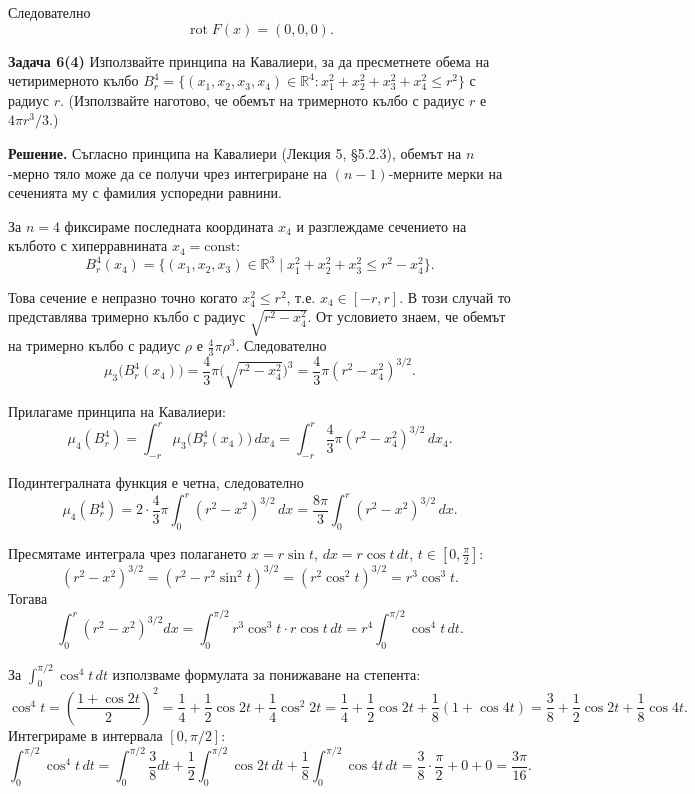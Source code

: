 \documentclass[10pt]{article}
\begin{document}
Следователно
\[
\boxed{\operatorname{rot} F(x) = (0,0,0)}.
\]

\textbf{Задача 6(4) }Използвайте принципа на Кавалиери, за да пресметнете обема на четиримерното кълбо $B_r^4 = \{(x_1,x_2,x_3,x_4)\in\mathbb{R}^4 : x_1^2+x_2^2+x_3^2+x_4^2 \le r^2\}$ с радиус $r$. (Използвайте наготово, че обемът на тримерното кълбо с радиус $r$ е $4\pi r^3/3$.)

\textbf{Решение.} 
Съгласно принципа на Кавалиери (Лекция 5, §5.2.3), обемът на $n$-мерно тяло може да се получи чрез интегриране на $(n-1)$-мерните мерки на сеченията му с фамилия успоредни равнини.

За $n=4$ фиксираме последната координата $x_4$ и разглеждаме сечението на кълбото с хиперравнината $x_4 = \text{const}$:
\[
B_r^4(x_4) = \{(x_1,x_2,x_3) \in \mathbb{R}^3 \mid x_1^2+x_2^2+x_3^2 \le r^2 - x_4^2\}.
\]

Това сечение е непразно точно когато $x_4^2 \le r^2$, т.е. $x_4 \in [-r,r]$. В този случай то представлява тримерно кълбо с радиус $\sqrt{r^2 - x_4^2}$. От условието знаем, че обемът на тримерно кълбо с радиус $\rho$ е $\frac{4}{3}\pi \rho^3$. Следователно
\[
\mu_3\bigl(B_r^4(x_4)\bigr) = \frac{4}{3}\pi \bigl(\sqrt{r^2 - x_4^2}\bigr)^3 = \frac{4}{3}\pi (r^2 - x_4^2)^{3/2}.
\]

Прилагаме принципа на Кавалиери:
\[
\mu_4(B_r^4) = \int_{-r}^{r} \mu_3\bigl(B_r^4(x_4)\bigr) \,dx_4 = \int_{-r}^{r} \frac{4}{3}\pi (r^2 - x_4^2)^{3/2} \,dx_4.
\]

Подинтегралната функция е четна, следователно
\[
\mu_4(B_r^4) = 2 \cdot \frac{4}{3}\pi \int_{0}^{r} (r^2 - x^2)^{3/2} \,dx = \frac{8\pi}{3} \int_{0}^{r} (r^2 - x^2)^{3/2} \,dx.
\]

Пресмятаме интеграла чрез полагането $x = r\sin t$, $dx = r\cos t\,dt$, $t \in [0,\frac{\pi}{2}]$:
\[
(r^2 - x^2)^{3/2} = (r^2 - r^2\sin^2 t)^{3/2} = (r^2\cos^2 t)^{3/2} = r^3 \cos^3 t.
\]
Тогава
\[
\int_0^r (r^2 - x^2)^{3/2} dx = \int_0^{\pi/2} r^3 \cos^3 t \cdot r\cos t \,dt = r^4 \int_0^{\pi/2} \cos^4 t \,dt.
\]

За $\int_0^{\pi/2} \cos^4 t \,dt$ използваме формулата за понижаване на степента:
\[
\cos^4 t = \left(\frac{1+\cos 2t}{2}\right)^2 = \frac{1}{4} + \frac{1}{2}\cos 2t + \frac{1}{4}\cos^2 2t = \frac{1}{4} + \frac{1}{2}\cos 2t + \frac{1}{8}(1+\cos 4t) = \frac{3}{8} + \frac{1}{2}\cos 2t + \frac{1}{8}\cos 4t.
\]
Интегрираме в интервала $[0,\pi/2]$:
\[
\int_0^{\pi/2} \cos^4 t \,dt = \int_0^{\pi/2} \frac{3}{8} dt + \frac{1}{2}\int_0^{\pi/2} \cos 2t \,dt + \frac{1}{8}\int_0^{\pi/2} \cos 4t \,dt = \frac{3}{8}\cdot\frac{\pi}{2} + 0 + 0 = \frac{3\pi}{16}.
\]
\end{document}
